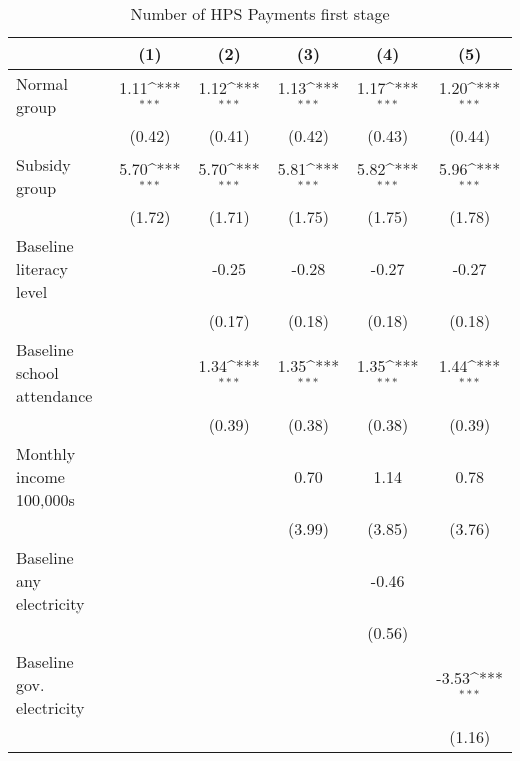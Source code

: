 \begin{table}[htbp]\centering
\def\sym#1{\ifmmode^{#1}\else\(^{#1}\)\fi}
\caption{Number of HPS Payments first stage}
\begin{tabular*}{1\hsize}{@{\hskip\tabcolsep\extracolsep\fill}l*{5}{c}}
\toprule
                &\multicolumn{1}{c}{(1)}         &\multicolumn{1}{c}{(2)}         &\multicolumn{1}{c}{(3)}         &\multicolumn{1}{c}{(4)}         &\multicolumn{1}{c}{(5)}         \\
\midrule
Normal group    &     1.11\sym{***}&     1.12\sym{***}&     1.13\sym{***}&     1.17\sym{***}&     1.20\sym{***}\\
                &   (0.42)         &   (0.41)         &   (0.42)         &   (0.43)         &   (0.44)         \\
Subsidy group   &     5.70\sym{***}&     5.70\sym{***}&     5.81\sym{***}&     5.82\sym{***}&     5.96\sym{***}\\
                &   (1.72)         &   (1.71)         &   (1.75)         &   (1.75)         &   (1.78)         \\
Baseline literacy level&                  &    -0.25         &    -0.28         &    -0.27         &    -0.27         \\
                &                  &   (0.17)         &   (0.18)         &   (0.18)         &   (0.18)         \\
Baseline school attendance&                  &     1.34\sym{***}&     1.35\sym{***}&     1.35\sym{***}&     1.44\sym{***}\\
                &                  &   (0.39)         &   (0.38)         &   (0.38)         &   (0.39)         \\
Monthly income 100,000s&                  &                  &     0.70         &     1.14         &     0.78         \\
                &                  &                  &   (3.99)         &   (3.85)         &   (3.76)         \\
Baseline any electricity&                  &                  &                  &    -0.46         &                  \\
                &                  &                  &                  &   (0.56)         &                  \\
Baseline gov. electricity&                  &                  &                  &                  &    -3.53\sym{***}\\
                &                  &                  &                  &                  &   (1.16)         \\

\end{tabular*}
\end{table}
